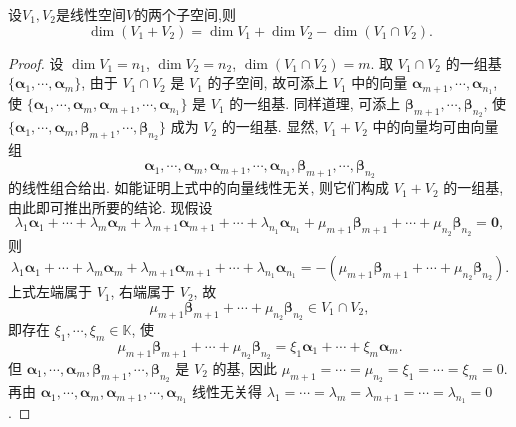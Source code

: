 \documentclass[../../main.tex]{subfiles}%
\begin{document}
\begin{theorem}[交和空间维数公式]\label{theorem:交和空间维数公式}
设\(V_1,V_2\)是线性空间\(V\)的两个子空间,则
\[
\dim(V_1 + V_2)=\dim V_1+\dim V_2-\dim(V_1\cap V_2).
\]
\end{theorem}
\begin{proof}
设 $\dim V_1 = n_1$, $\dim V_2 = n_2$, $\dim(V_1 \cap V_2) = m$. 取 $V_1 \cap V_2$ 的一组基 $\{\boldsymbol{\alpha}_1, \cdots, \boldsymbol{\alpha}_m\}$, 由于 $V_1 \cap V_2$ 是 $V_1$ 的子空间, 故可添上 $V_1$ 中的向量 $\boldsymbol{\alpha}_{m + 1}, \cdots, \boldsymbol{\alpha}_{n_1}$, 使 $\{\boldsymbol{\alpha}_1, \cdots, \boldsymbol{\alpha}_m, \boldsymbol{\alpha}_{m + 1}, \cdots, \boldsymbol{\alpha}_{n_1}\}$ 是 $V_1$ 的一组基. 同样道理, 可添上 $\boldsymbol{\beta}_{m + 1}, \cdots, \boldsymbol{\beta}_{n_2}$, 使 $\{\boldsymbol{\alpha}_1, \cdots, \boldsymbol{\alpha}_m, \boldsymbol{\beta}_{m + 1}, \cdots, \boldsymbol{\beta}_{n_2}\}$ 成为 $V_2$ 的一组基. 显然, $V_1 + V_2$ 中的向量均可由向量组
$$
\boldsymbol{\alpha}_1, \cdots, \boldsymbol{\alpha}_m, \boldsymbol{\alpha}_{m + 1}, \cdots, \boldsymbol{\alpha}_{n_1}, \boldsymbol{\beta}_{m + 1}, \cdots, \boldsymbol{\beta}_{n_2}
$$
的线性组合给出. 如能证明上式中的向量线性无关, 则它们构成 $V_1 + V_2$ 的一组基, 由此即可推出所要的结论. 现假设
$$
\lambda_1\boldsymbol{\alpha}_1 + \cdots + \lambda_m\boldsymbol{\alpha}_m + \lambda_{m + 1}\boldsymbol{\alpha}_{m + 1} + \cdots + \lambda_{n_1}\boldsymbol{\alpha}_{n_1} + \mu_{m + 1}\boldsymbol{\beta}_{m + 1} + \cdots + \mu_{n_2}\boldsymbol{\beta}_{n_2} = \boldsymbol{0},
$$
则
$$
\lambda_1\boldsymbol{\alpha}_1 + \cdots + \lambda_m\boldsymbol{\alpha}_m + \lambda_{m + 1}\boldsymbol{\alpha}_{m + 1} + \cdots + \lambda_{n_1}\boldsymbol{\alpha}_{n_1} = -(\mu_{m + 1}\boldsymbol{\beta}_{m + 1} + \cdots + \mu_{n_2}\boldsymbol{\beta}_{n_2}).
$$
上式左端属于 $V_1$, 右端属于 $V_2$, 故
$$
\mu_{m + 1}\boldsymbol{\beta}_{m + 1} + \cdots + \mu_{n_2}\boldsymbol{\beta}_{n_2} \in V_1 \cap V_2,
$$
即存在 $\xi_1, \cdots, \xi_m \in \mathbb{K}$, 使
$$
\mu_{m + 1}\boldsymbol{\beta}_{m + 1} + \cdots + \mu_{n_2}\boldsymbol{\beta}_{n_2} = \xi_1\boldsymbol{\alpha}_1 + \cdots + \xi_m\boldsymbol{\alpha}_m.
$$
但 $\boldsymbol{\alpha}_1, \cdots, \boldsymbol{\alpha}_m, \boldsymbol{\beta}_{m + 1}, \cdots, \boldsymbol{\beta}_{n_2}$ 是 $V_2$ 的基, 因此 $\mu_{m + 1} = \cdots = \mu_{n_2} = \xi_1 = \cdots = \xi_m = 0$. 再由 $\boldsymbol{\alpha}_1, \cdots, \boldsymbol{\alpha}_m, \boldsymbol{\alpha}_{m + 1}, \cdots, \boldsymbol{\alpha}_{n_1}$ 线性无关得 $\lambda_1 = \cdots = \lambda_m = \lambda_{m + 1} = \cdots = \lambda_{n_1} = 0$. 
\end{proof}
\end{document}
